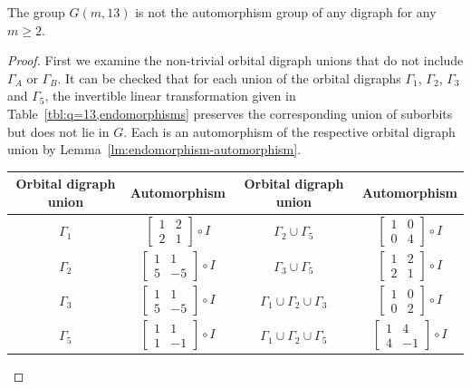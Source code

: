 \begin{theorem} \label{thm:q=13}
The group $G{\left(m, 13 \right)}$ is not the automorphism group of any digraph for any $m \geqslant 2$.
\end{theorem}
\begin{proof}
First we examine the non-trivial orbital digraph unions that do not include $\Gamma_A$ or $\Gamma_B$. It can be checked that for each union of the orbital digraphs $\Gamma_1$, $\Gamma_2$, $\Gamma_3$ and $\Gamma_5$, the invertible linear transformation given in Table~\ref{tbl:q=13,endomorphisms} preserves the corresponding union of suborbits but does not lie in $G$. Each is an automorphism of the respective orbital digraph union by Lemma~\ref{lm:endomorphism-automorphism}.

\begin{table}
\centering
\begin{tabular}{cc||cc}
\hline
Orbital digraph union & Automorphism & Orbital digraph union & Automorphism \\
\hline
\vphantom{\Bigg(} $\Gamma_1$ & $\begin{bmatrix} 1 & 2 \\ 2 & 1 \end{bmatrix} \circ I$ & $\Gamma_2 \cup \Gamma_5$ & $\begin{bmatrix} 1 & 0 \\ 0 & 4 \end{bmatrix} \circ I$ \\
\vphantom{\Bigg(} $\Gamma_2$ & $\begin{bmatrix} 1 & 1 \\ 5 & -5 \end{bmatrix} \circ I$ & $\Gamma_3 \cup \Gamma_5$ & $\begin{bmatrix} 1 & 2 \\ 2 & 1 \end{bmatrix} \circ I$ \\
\vphantom{\Bigg(} $\Gamma_3$ & $\begin{bmatrix} 1 & 1 \\ 5 & -5 \end{bmatrix} \circ I$ & $\Gamma_1 \cup \Gamma_2 \cup \Gamma_3$ & $\begin{bmatrix} 1 & 0 \\ 0 & 2 \end{bmatrix} \circ I$ \\
\vphantom{\Bigg(} $\Gamma_5$ & $\begin{bmatrix} 1 & 1 \\ 1 & -1 \end{bmatrix} \circ I$ & $\Gamma_1 \cup \Gamma_2 \cup \Gamma_5$ & $\begin{bmatrix} 1 & 4 \\ 4 & -1 \end{bmatrix} \circ I$ \\

\end{tabular}
\end{table}
\end{proof}
